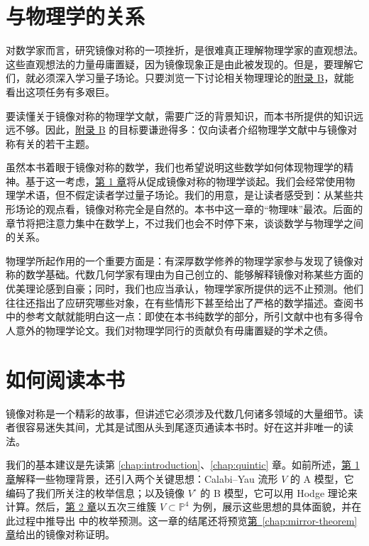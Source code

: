 \section*{与物理学的关系}
对数学家而言，研究镜像对称的一项挫折，是很难真正理解物理学家的直观想法。这些直观想法的力量毋庸置疑，因为镜像现象正是由此被发现的。但是，要理解它们，就必须深入学习量子场论。只要浏览一下讨论相关物理理论的\hyperref[app:physical-theories]{附录 B}，就能看出这项任务有多艰巨。

要读懂关于镜像对称的物理学文献，需要广泛的背景知识，而本书所提供的知识远远不够。因此，\hyperref[app:physical-theories]{附录 B} 的目标要谦逊得多：仅向读者介绍物理学文献中与镜像对称有关的若干主题。

虽然本书着眼于镜像对称的数学，我们也希望说明这些数学如何体现物理学的精神。基于这一考虑，\hyperref[chap:introduction]{第 1 章}将从促成镜像对称的物理学谈起。我们会经常使用物理学术语，但不假定读者学过量子场论。我们的用意，是让读者感受到：从某些共形场论的观点看，镜像对称完全是自然的。本书中这一章的“物理味”最浓。后面的章节将把注意力集中在数学上，不过我们也会不时停下来，谈谈数学与物理学之间的关系。

物理学所起作用的一个重要方面是：有深厚数学修养的物理学家参与发现了镜像对称的数学基础。代数几何学家有理由为自己创立的、能够解释镜像对称某些方面的优美理论感到自豪；同时，我们也应当承认，物理学家所提供的远不止预测。他们往往还指出了应研究哪些对象，在有些情形下甚至给出了严格的数学描述。查阅书中的参考文献就能明白这一点：即使在本书纯数学的部分，所引文献中也有多得令人意外的物理学论文。我们对物理学同行的贡献负有毋庸置疑的学术之债。

\section*{如何阅读本书}
镜像对称是一个精彩的故事，但讲述它必须涉及代数几何诸多领域的大量细节。读者很容易迷失其间，尤其是试图从头到尾逐页通读本书时。好在这并非唯一的读法。

我们的基本建议是先读第 \hyperref[chap:introduction]{\ref*{chap:introduction}}、\hyperref[chap:quintic]{\ref*{chap:quintic}} 章。如前所述，\hyperref[chap:introduction]{第 1 章}解释一些物理背景，还引入两个关键思想：Calabi--Yau 流形 $V$ 的 A 模型，它编码了我们所关注的枚举信息；以及镜像 $V^\circ$ 的 B 模型，它可以用 Hodge 理论来计算。然后，\hyperref[chap:quintic]{第 2 章}以五次三维簇 $V\subset\mathbb P^4$ 为例，展示这些思想的具体面貌，并在此过程中推导出  中的枚举预测。这一章的结尾还将预览\hyperref[chap:mirror-theorem]{第~\ref*{chap:mirror-theorem} 章}给出的镜像对称证明。

